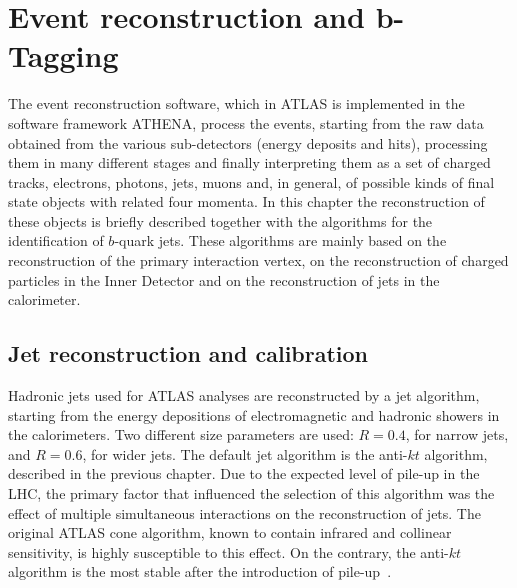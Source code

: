 %
%

\chapter{Event reconstruction and $\bm b$-Tagging }\label{ch:reco}


The event reconstruction software, which in ATLAS is implemented in the software framework ATHENA, process the events, starting from the raw data obtained from the various sub-detectors (energy deposits and hits), processing them in many different stages and finally interpreting them as a set of charged tracks, electrons, photons, jets, muons and, in general, of possible kinds of final state objects with related four momenta.  
In this chapter the reconstruction of these objects is briefly described together with the algorithms for the identification of $b$-quark jets.  These algorithms are mainly based on the reconstruction of the primary interaction vertex, on the reconstruction of charged particles in the Inner Detector and on the reconstruction of jets in the calorimeter.   

\section{Jet reconstruction and calibration}\label{sec:ObjSelection}

Hadronic jets used for ATLAS analyses are reconstructed by a jet algorithm, starting from the energy depositions of electromagnetic and hadronic showers in the calorimeters.  Two different size parameters are used: $R = 0.4$, for narrow jets, and $R = 0.6$, for wider jets. The default jet algorithm is the anti-$kt$ algorithm, described in the previous chapter. Due to the expected level of pile-up in the LHC, the primary factor that influenced the selection of this algorithm was the effect of multiple simultaneous interactions on the reconstruction of jets. The original ATLAS cone algorithm, known to contain infrared and collinear sensitivity, is highly susceptible to this effect. On the contrary, the anti-$kt$ algorithm is the most stable after the introduction of pile-up~\cite{Asquith:1311867}.  

